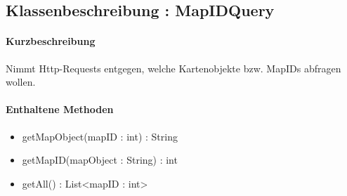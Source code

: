 \subsection{Klassenbeschreibung : MapIDQuery}%
\paragraph*{Kurzbeschreibung}
Nimmt Http-Requests entgegen, welche Kartenobjekte bzw. MapIDs abfragen wollen.
\paragraph*{Enthaltene Methoden}
\begin{itemize}
    \item getMapObject(mapID : int) : String
    \item getMapID(mapObject : String) : int
    \item getAll() : List<mapID : int>
\end{itemize}